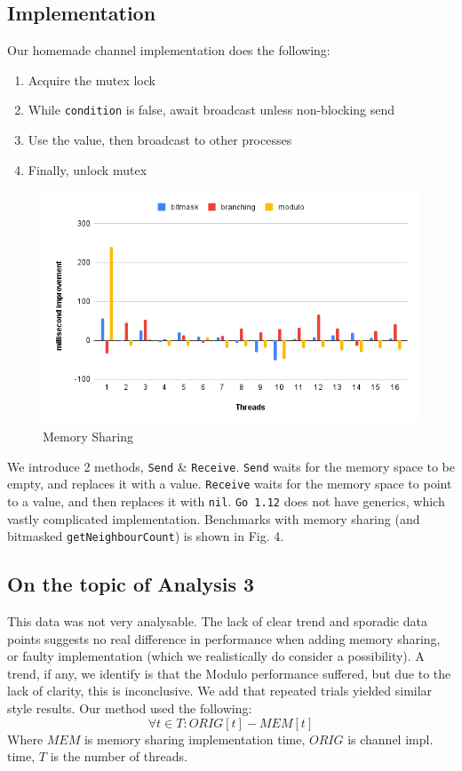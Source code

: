 \documentclass[twoside,twocolumn]{article}
\begin{document}
\subsection{Implementation}
Our homemade channel implementation does the following:
\begin{enumerate}[noitemsep]
  \item Acquire the mutex lock
  \item While \texttt{condition} is false, await broadcast unless non-blocking send
  \item Use the value, then broadcast to other processes
  \item Finally, unlock mutex
\end{enumerate}
\begin{figure}
  \includegraphics[width=\linewidth]{memshare.png}
  \caption{Memory Sharing}
  \label{fig:chart4}
\end{figure}
We introduce 2 methods, \texttt{Send} \& \texttt{Receive}. \texttt{Send} waits for the memory space 
to be empty, and replaces it with a value. \texttt{Receive} waits for the memory space to point to a value, and then 
replaces it with \texttt{nil}. \texttt{Go 1.12} does not have generics, which vastly complicated implementation. 
Benchmarks with memory sharing (and bitmasked \texttt{getNeighbourCount}) is shown in Fig. 4.
\subsection{On the topic of Analysis 3}
This data was not very analysable. The lack of clear trend and sporadic data points suggests no real difference 
in performance when adding memory sharing, or faulty implementation (which we realistically do consider a possibility).
A trend, if any, we identify is that the Modulo performance suffered, but due to the lack of clarity, this is inconclusive.
We add that repeated trials yielded similar style results. Our method used the following: \[\forall t \in T: ORIG[t] - MEM[t]\]
Where $MEM$ is memory sharing implementation time, $ORIG$ is channel impl. time, $T$ is the number of threads. 
\end{document}
